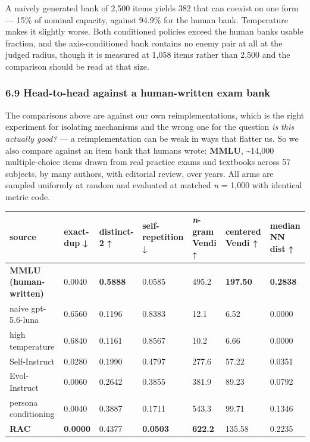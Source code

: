 \documentclass[
  11pt,
]{article}
\theoremstyle{plain}
\theoremstyle{definition}
\begin{document}
A naively generated bank of 2,500 items yields 382 that can coexist on
one form --- 15\% of nominal capacity, against 94.9\% for the human
bank. Temperature makes it slightly worse. Both conditioned policies
exceed the human bank\textquotesingle s usable fraction, and the
axis-conditioned bank contains no enemy pair at all at the judged
radius, though it is measured at 1,058 items rather than 2,500 and the
comparison should be read at that size.

\subsubsection{6.9 Head-to-head against a human-written exam
bank}\label{69-head-to-head-against-a-human-written-exam-bank}

The comparisons above are against our own reimplementations, which is
the right experiment for isolating mechanisms and the wrong one for the
question \emph{is this actually good?} --- a reimplementation can be
weak in ways that flatter us. So we also compare against an item bank
that humans wrote: \textbf{MMLU}, \textasciitilde14,000 multiple-choice
items drawn from real practice exams and textbooks across 57 subjects,
by many authors, with editorial review, over years. All arms are sampled
uniformly at random and evaluated at matched \emph{n} = 1,000 with
identical metric code.

\begin{longtable}[]{@{}lllllll@{}}
\toprule\noalign{}
source & exact-dup ↓ & distinct-2 ↑ & self-repetition ↓ & \emph{n}-gram
Vendi ↑ & centered Vendi ↑ & median NN dist ↑ \\
\midrule\noalign{}
\endhead
\bottomrule\noalign{}
\endlastfoot
\textbf{MMLU (human-written)} & 0.0040 & \textbf{0.5888} & 0.0585 &
495.2 & \textbf{197.50} & \textbf{0.2838} \\
naive gpt-5.6-luna & 0.6560 & 0.1196 & 0.8383 & 12.1 & 6.52 & 0.0000 \\
high temperature & 0.6840 & 0.1161 & 0.8567 & 10.2 & 6.66 & 0.0000 \\
Self-Instruct & 0.0280 & 0.1990 & 0.4797 & 277.6 & 57.22 & 0.0351 \\
Evol-Instruct & 0.0060 & 0.2642 & 0.3855 & 381.9 & 89.23 & 0.0792 \\
persona conditioning & 0.0040 & 0.3887 & 0.1711 & 543.3 & 99.71 &
0.1346 \\
\textbf{RAC} & \textbf{0.0000} & 0.4377 & \textbf{0.0503} &
\textbf{622.2} & 135.58 & 0.2235 \\
\end{longtable}
\end{document}
